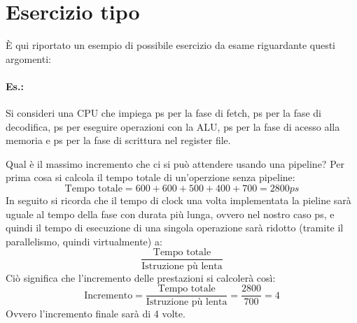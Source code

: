 \documentclass[class=book, crop=false, oneside]{standalone}
\begin{document}
\section{Esercizio tipo}
È qui riportato un esempio di possibile esercizio da esame riguardante questi argomenti:
\paragraph{Es.:} Si consideri una CPU che impiega \unit[600]{ps} per la fase di fetch, \unit[600]{ps} per la fase di decodifica, \unit[500]{ps} per eseguire operazioni con la ALU, \unit[400]{ps} per la fase di acesso alla memoria e \unit[700]{ps} per la fase di scrittura nel register file.

Qual è il massimo incremento che ci si può attendere usando una pipeline?
Per prima cosa si calcola il tempo totale di un'operzione senza pipeline:
\[\text{Tempo totale} = 600+600+500+400+700 = 2800ps\]
In seguito si ricorda che il tempo di clock una volta implementata la pieline sarà uguale al tempo della fase con durata più lunga, ovvero nel nostro caso \unit[700]{ps}, e quindi il tempo di esecuzione di una singola operazione sarà ridotto (tramite il parallelismo, quindi virtualmente) a: \[\frac{\text{Tempo totale}}{\text{Istruzione pù lenta}}\]
Ciò significa che l'incremento delle prestazioni si calcolerà così:
\[\text{Incremento} = \frac{\text{Tempo totale}}{\text{Istruzione pù lenta}} = \frac{2800}{700} = 4\]
Ovvero l'incremento finale sarà di 4 volte.
\end{document}

